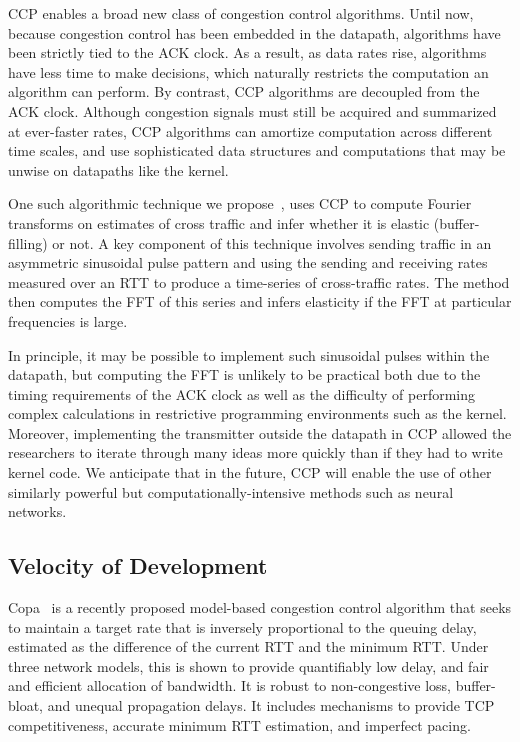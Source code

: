 CCP enables a broad new class of congestion control algorithms.
Until now, because congestion control has been embedded in the datapath,
algorithms have been strictly tied to the ACK clock.
As a result, as data rates rise, algorithms have less time to make decisions,
which naturally restricts the computation an algorithm can perform.
By contrast, CCP algorithms are decoupled from the ACK clock.
Although congestion signals must still be acquired and summarized at ever-faster rates, CCP algorithms can amortize computation across different time scales, and use sophisticated data structures and computations that may be unwise on datapaths like the kernel.

One such algorithmic technique we propose~\cite{nimbus}, uses CCP to compute Fourier transforms on estimates of cross traffic and infer whether it is elastic (buffer-filling) or not.
A key component of this technique involves sending traffic in an asymmetric sinusoidal pulse pattern and using the sending and receiving rates measured over an RTT to produce a time-series of cross-traffic rates. The method then computes the FFT of this series and infers elasticity if the FFT at particular frequencies is large.

In principle, it may be possible to implement such sinusoidal pulses within the datapath, but computing the FFT is unlikely to be practical both due to the timing requirements of the ACK clock as well as the difficulty of performing complex calculations in restrictive programming environments such as the kernel. Moreover, implementing the transmitter outside the datapath in CCP allowed the researchers to iterate through many ideas more quickly than if they had to write kernel code.
We anticipate that in the future, CCP will enable the use of other similarly powerful but computationally-intensive methods such as neural networks.

\subsection{Velocity of Development}
\label{s:capabilities:velocity}

Copa~\cite{copa} is a recently proposed model-based congestion control algorithm that seeks to maintain a target rate that is inversely proportional to the queuing delay, estimated as the difference of the current RTT and the minimum RTT.
Under three network models, this is shown to provide quantifiably low delay, and fair and efficient allocation of bandwidth.
It is robust to non-congestive loss, buffer-bloat, and unequal propagation delays. It includes mechanisms to provide TCP competitiveness, accurate minimum RTT estimation, and imperfect pacing.

